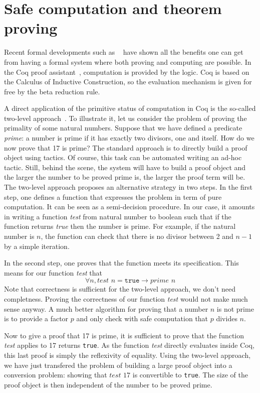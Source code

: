 

\section{Safe computation and theorem proving}

Recent formal developments such as ~\cite{4color,kepler} have shown all the benefits
one can get from having a formal system where both proving and computing are
possible. In the {\sc Coq} proof assistant~\cite{Coq}, computation is
provided by the logic. {\sc Coq} is based on the Calculus of 
Inductive Construction, so the evaluation mechanism is given for free
by the beta reduction rule. 

A direct application of the primitive status of computation in {\sc Coq} is 
the so-called two-level approach~\cite{boutin}. To illustrate it, 
let us consider the problem of proving the primality of some natural 
numbers.
Suppose that we have defined a predicate {\it prime}: a number is prime 
if it has exactly two divisors, one and itself. 
How do we now prove that 17 is prime? The standard approach is to
directly build a proof object using tactics. Of course, this task can be 
automated writing an ad-hoc tactic. Still, behind the scene, the system 
will have to build a proof object and the larger the number to be proved
prime is, the larger the proof term will be.
The two-level approach proposes an alternative
strategy in two steps. In the first step, one defines a function that expresses
the problem in term of pure computation. It can be seen as a semi-decision procedure.
In our case, it amounts in writing a 
function {\it test} from natural number to boolean such that if the function
returns {\it true} then the number is prime. 
For example, if the natural number
is $n$, the function can check that there is no divisor between 2 and $n-1$
by a simple iteration. 

In the second step, one proves that the function meets 
its specification. This means for our function {\it test} that
$$
\forall n, \textit{test}\,\, n = \texttt{true} \rightarrow \textit{prime}\,\, n
$$
Note that correctness is sufficient for the two-level approach, we don't need
completness. Proving the correctness of our function {\it test} would not make much sense
anyway.
A much better algorithm for proving that a number $n$ is not prime is to provide a factor
$p$ and only check with safe computation that $p$ divides $n$.

Now to give a proof that 17 is prime, it is sufficient to prove that the function
{\it test} applies to 17 returns {\tt true}. As the function {\it test} directly
evaluates inside {\sc Coq}, this last proof is simply the reflexivity of equality.
Using the two-level approach, we have just transfered the problem of building a 
large proof object into a conversion problem: showing that $\textit{test}\,\, 17$ is convertible
to {\tt true}.  The size of the proof object is then independent of the number to be proved
prime. 

